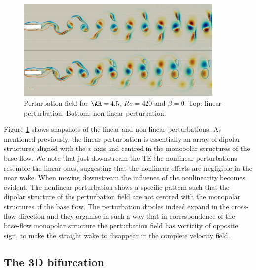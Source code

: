 \begin{figure}
  \centering
  \includegraphics[width=0.9\textwidth]{./fig/AR4p5/nl_Re420.png}
  \caption{Perturbation field for $\AR=4.5$, $Re=420$ and $\beta=0$. Top: linear perturbation. Bottom: non linear perturbation.}
  \label{fig:pert-nl}
\end{figure}

Figure \ref{fig:pert-nl} shows snapshots of the linear and non linear perturbations. As mentioned previously, the linear perturbation is essentially an array of dipolar structures aligned with the $x$ axis and centred in the monopolar structures of the base flow. We note that just downstream the TE the nonlinear perturbations resemble the linear ones, suggesting that the nonlinear effects are negligible in the near wake. When moving downstream the influence of the nonlinearity becomes evident. The nonlinear perturbation shows a specific pattern such that the dipolar structure of the perturbation field are not centred with the monopolar structures of the base flow. The perturbation dipoles indeed expand in the cross-flow direction and they organise in such a way that in correspondence of the base-flow monopolar structure the perturbation field has vorticity of opposite sign, to make the straight wake to disappear in the complete velocity field.

\subsection{The 3D bifurcation}

